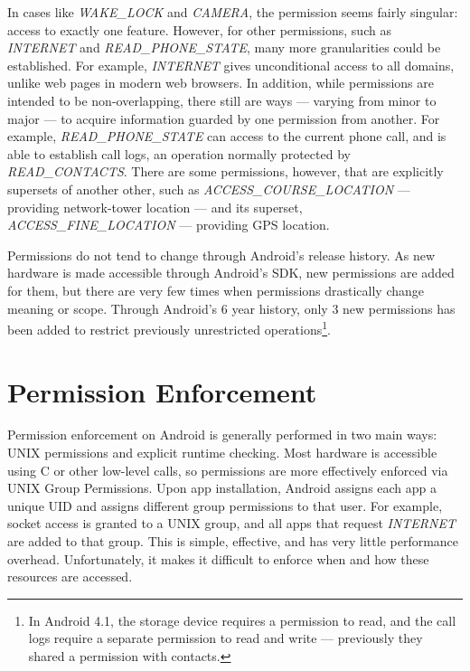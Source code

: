 In cases like \textit{WAKE\_LOCK} and \textit{CAMERA}, the permission seems fairly singular: access to exactly one feature. However, for other permissions, such as \textit{INTERNET} and \textit{READ\_PHONE\_STATE}, many more granularities could be established. For example, \textit{INTERNET} gives unconditional access to all domains, unlike web pages in modern web browsers. In addition, while permissions are intended to be non-overlapping, there still are ways --- varying from minor to major --- to acquire information guarded by one permission from another. For example, \textit{READ\_PHONE\_STATE} can access to the current phone call, and is able to establish call logs, an operation normally protected by \textit{READ\_CONTACTS}. There are some permissions, however, that are explicitly supersets of another other, such as \textit{ACCESS\_COURSE\_LOCATION} --- providing network-tower location --- and its superset, \textit{ACCESS\_FINE\_LOCATION} --- providing GPS location. 

Permissions do not tend to change through Android's release history. As new hardware is made accessible through Android's SDK, new permissions are added for them, but there are very few times when permissions drastically change meaning or scope. Through Android's 6 year history, only 3 new permissions has been added to restrict previously unrestricted operations\footnote{In Android 4.1, the storage device requires a permission to read, and the call logs require a separate permission to read and write --- previously they shared a permission with contacts\citep{android41new}.}.

\section{Permission Enforcement}
Permission enforcement on Android is generally performed in two main ways: UNIX permissions and explicit runtime checking. Most hardware is accessible using C or other low-level calls, so permissions are more effectively enforced via UNIX Group Permissions. Upon app installation, Android assigns each app a unique UID and assigns different group permissions to that user. For example, socket access is granted to a UNIX group, and all apps that request \textit{INTERNET} are added to that group. This is simple, effective, and has very little performance overhead. Unfortunately, it makes it difficult to enforce when and how these resources are accessed. 

